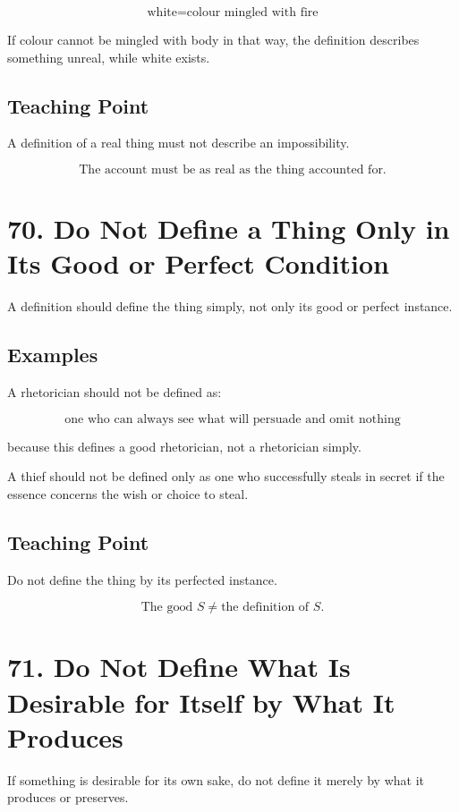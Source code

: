 \documentclass[12pt]{article}
\begin{document}
\[
\text{white} = \text{colour mingled with fire}
\]

If colour cannot be mingled with body in that way, the definition describes
something unreal, while white exists.

\subsection*{Teaching Point}

A definition of a real thing must not describe an impossibility.

\[
\boxed{
\text{The account must be as real as the thing accounted for.}
}
\]

\section*{70. Do Not Define a Thing Only in Its Good or Perfect Condition}

A definition should define the thing simply, not only its good or perfect
instance.

\subsection*{Examples}

A rhetorician should not be defined as:

\[
\text{one who can always see what will persuade and omit nothing}
\]

because this defines a good rhetorician, not a rhetorician simply.

A thief should not be defined only as one who successfully steals in secret if
the essence concerns the wish or choice to steal.

\subsection*{Teaching Point}

Do not define the thing by its perfected instance.

\[
\boxed{
\text{The good } S \neq \text{the definition of } S.
}
\]

\section*{71. Do Not Define What Is Desirable for Itself by What It Produces}

If something is desirable for its own sake, do not define it merely by what it
produces or preserves.
\end{document}
